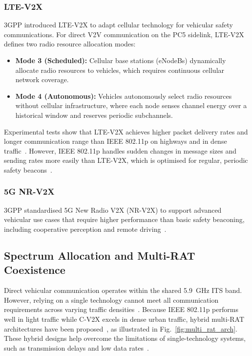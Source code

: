 \subsubsection{LTE-V2X}
3GPP introduced LTE-V2X to adapt cellular technology for vehicular safety communications.
For direct V2V communication on the PC5 sidelink, LTE-V2X defines two radio resource allocation modes:
\begin{itemize}
    \item \textbf{Mode 3 (Scheduled):} Cellular base stations (eNodeBs) dynamically allocate radio resources to vehicles, which requires continuous cellular network coverage.
    \item \textbf{Mode 4 (Autonomous):} Vehicles autonomously select radio resources without cellular infrastructure, where each node senses channel energy over a historical window and reserves periodic subchannels.
\end{itemize}
Experimental tests show that LTE-V2X achieves higher packet delivery rates and longer communication range than IEEE 802.11p on highways and in dense traffic~\cite{nguyen2017comparison}.
However, IEEE 802.11p handles sudden changes in message sizes and sending rates more easily than LTE-V2X, which is optimised for regular, periodic safety beacons~\cite{molina2020comparison}.

\subsubsection{5G NR-V2X}
3GPP standardised 5G New Radio V2X (NR-V2X) to support advanced vehicular use cases that require higher performance than basic safety beaconing, including cooperative perception and remote driving~\cite{castaneda2021tutorial}.

\subsection{Spectrum Allocation and Multi-RAT Coexistence}
\label{subsec:spectrum_coexistence}

Direct vehicular communication operates within the shared 5.9~GHz ITS band.
However, relying on a single technology cannot meet all communication requirements across varying traffic densities~\cite{bazzi2022performance}.
Because IEEE 802.11p performs well in light traffic while C-V2X excels in dense urban traffic, hybrid multi-RAT architectures have been proposed~\cite{ansari2021joint}, as illustrated in Fig.~\ref{fig:multi_rat_arch}.
These hybrid designs help overcome the limitations of single-technology systems, such as transmission delays and low data rates~\cite{qi2020traffic}.

